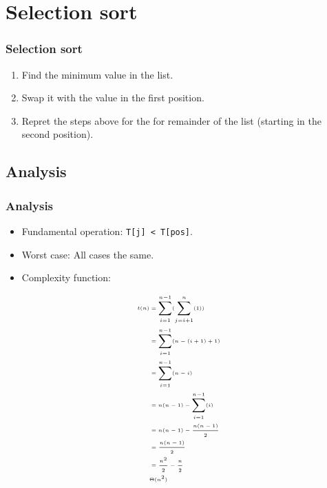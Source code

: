 \documentclass{beamer}
\begin{document}
\section{Selection sort}
\begin{frame}
\frametitle{Selection sort}
\begin{enumerate}
\item Find the minimum value in the list.
\item Swap it with the value in the first position.
\item Repret the steps above for the for remainder of the list (starting in the second position).
\selec
\end{enumerate}
\end{frame}
\subsection{Analysis}
\begin{frame}
\frametitle{Analysis}
\begin{itemize}
\item Fundamental operation: \texttt{T[j] < T[pos]}.
\item Worst case: All cases the same.
\item Complexity function:
\end{itemize}
\begin{equation}
\tiny
\begin{split}
t(n) & = \displaystyle\sum_{i=1}^{n-1}(\displaystyle\sum_{j=i+1}^n(1))\\
&= \displaystyle\sum_{i=1}^{n-1}(n-(i+1)+1)\\
&= \displaystyle\sum_{i=1}^{n-1}(n-i)\\
&= n(n-1)-\displaystyle\sum_{i=1}^{n-1}(i)\\
&= n(n-1)-\frac{n(n-1)}{2}\\
&= \frac{n(n-1)}{2}\\
&= \frac{n^2}{2} - \frac{n}{2}\\
&\Theta(n^2)
\end{split}
\end{equation}
\end{frame}
\end{document}
